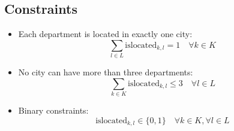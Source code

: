 \documentclass{article}
\begin{document}
\subsection*{Constraints}
\begin{itemize}
    \item Each department is located in exactly one city:
    \[
    \sum_{l \in L} \text{islocated}_{k,l} = 1 \quad \forall k \in K
    \]
    
    \item No city can have more than three departments:
    \[
    \sum_{k \in K} \text{islocated}_{k,l} \leq 3 \quad \forall l \in L
    \]
    
    \item Binary constraints:
    \[
    \text{islocated}_{k,l} \in \{0, 1\} \quad \forall k \in K, \forall l \in L
    \]
\end{itemize}
\end{document}
